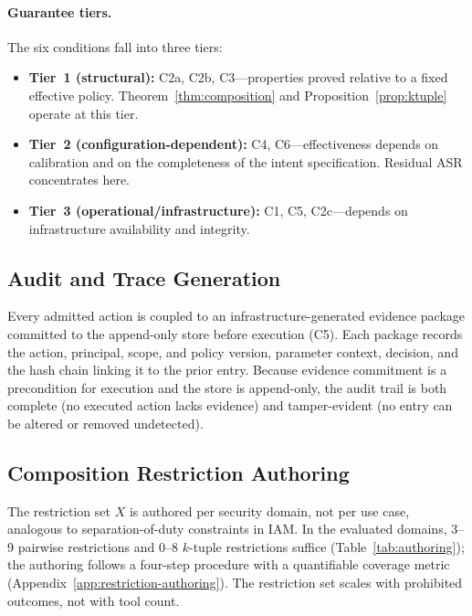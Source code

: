 \documentclass[sigconf,nonacm]{acmart}
\begin{document}
\paragraph{Guarantee tiers.} The six conditions fall into three tiers:
\begin{itemize}
\item \textbf{Tier~1 (structural):} C2a, C2b, C3---properties proved relative to a fixed effective policy. Theorem~\ref{thm:composition} and Proposition~\ref{prop:ktuple} operate at this tier.
\item \textbf{Tier~2 (configuration-dependent):} C4, C6---effectiveness depends on calibration and on the completeness of the intent specification. Residual ASR concentrates here.
\item \textbf{Tier~3 (operational/infrastructure):} C1, C5, C2c---depends on infrastructure availability and integrity.
\end{itemize}

\subsection{Audit and Trace Generation}\label{sec:audit}

Every admitted action is coupled to an infrastructure-generated evidence package committed to the append-only store before execution (C5). Each package records the action, principal, scope, and policy version, parameter context, decision, and the hash chain linking it to the prior entry. Because evidence commitment is a precondition for execution and the store is append-only, the audit trail is both complete (no executed action lacks evidence) and tamper-evident (no entry can be altered or removed undetected).

\subsection{Composition Restriction Authoring}\label{sec:restriction-authoring}

The restriction set $X$ is authored per security domain, not per use case, analogous to separation-of-duty constraints in IAM. In the evaluated domains, 3--9 pairwise restrictions and 0--8 $k$-tuple restrictions suffice (Table~\ref{tab:authoring}); the authoring follows a four-step procedure with a quantifiable coverage metric (Appendix~\ref{app:restriction-authoring}). The restriction set scales with prohibited outcomes, not with tool count.

\end{document}
